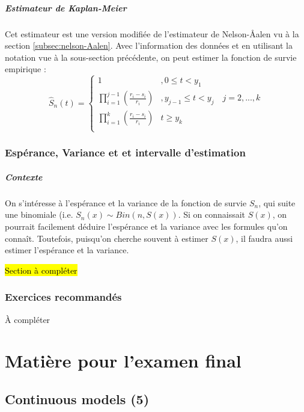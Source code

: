 \documentclass[12pt, french]{report}
\begin{document}
\subsubsection{Estimateur de Kaplan-Meier}
Cet estimateur est une version modifiée de l'estimateur de Nelson-\r{A}alen vu à la section \ref{subsec:nelson-Aalen}. Avec l'information des données et en utilisant la notation vue à la sous-section précédente, on peut estimer la fonction de survie empirique : 
\begin{equation}
\hat{S}_n(t) =
\begin{cases}
1		& , 0 \leq t < y_1 \\
\prod_{i=1}^{j-1} \left( \frac{r_i - s_i}{r_i} \right) & , y_{j-1} \leq t < y_j \quad j = 2, ..., k \\
\prod_{i=1}^{k} \left( \frac{r_i - s_i}{r_i}  \right) & t \geq y_k \\
\end{cases}
\end{equation}


\section{Espérance, Variance et et intervalle d'estimation}

\subsubsection{Contexte}
On s'intéresse à l'espérance et la variance de la fonction de survie $S_n$, qui suite une binomiale (i.e. $S_n(x) \sim Bin(n, S(x))$. Si on connaissait $S(x)$, on pourrait facilement déduire l'espérance et la variance avec les formules qu'on connaît. Toutefois, puisqu'on cherche souvent à estimer $S(x)$, il faudra aussi estimer l'espérance et la variance.

\hl{Section à compléter}


\section{Exercices recommandés}
À compléter



\part{Matière pour l'examen final}

\chapter{Continuous models (5)}
\end{document}

